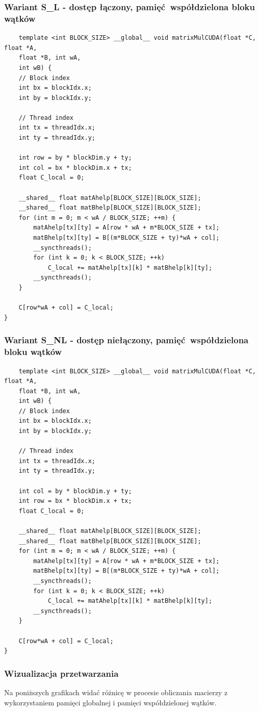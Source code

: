 \documentclass[10pt,a4paper]{article}
\begin{document}
\subsubsection*{Wariant S\_L - dostęp łączony, pamięć współdzielona bloku wątków}
\begin{lstlisting}
	template <int BLOCK_SIZE> __global__ void matrixMulCUDA(float *C, float *A,
	float *B, int wA,
	int wB) {
	// Block index
	int bx = blockIdx.x;
	int by = blockIdx.y;

	// Thread index
	int tx = threadIdx.x;
	int ty = threadIdx.y;

	int row = by * blockDim.y + ty;
	int col = bx * blockDim.x + tx;
	float C_local = 0;

	__shared__ float matAhelp[BLOCK_SIZE][BLOCK_SIZE];
	__shared__ float matBhelp[BLOCK_SIZE][BLOCK_SIZE];
	for (int m = 0; m < wA / BLOCK_SIZE; ++m) {
		matAhelp[tx][ty] = A[row * wA + m*BLOCK_SIZE + tx];
		matBhelp[tx][ty] = B[(m*BLOCK_SIZE + ty)*wA + col];
		__syncthreads();
		for (int k = 0; k < BLOCK_SIZE; ++k)
			C_local += matAhelp[tx][k] * matBhelp[k][ty];
		__syncthreads();
	}

	C[row*wA + col] = C_local;
}
\end{lstlisting}

\subsubsection*{Wariant S\_NL - dostęp niełączony, pamięć współdzielona bloku wątków}
\begin{lstlisting}
	template <int BLOCK_SIZE> __global__ void matrixMulCUDA(float *C, float *A,
	float *B, int wA,
	int wB) {
	// Block index
	int bx = blockIdx.x;
	int by = blockIdx.y;

	// Thread index
	int tx = threadIdx.x;
	int ty = threadIdx.y;

	int col = by * blockDim.y + ty;
	int row = bx * blockDim.x + tx;
	float C_local = 0;

	__shared__ float matAhelp[BLOCK_SIZE][BLOCK_SIZE];
	__shared__ float matBhelp[BLOCK_SIZE][BLOCK_SIZE];
	for (int m = 0; m < wA / BLOCK_SIZE; ++m) {
		matAhelp[tx][ty] = A[row * wA + m*BLOCK_SIZE + tx];
		matBhelp[tx][ty] = B[(m*BLOCK_SIZE + ty)*wA + col];
		__syncthreads();
		for (int k = 0; k < BLOCK_SIZE; ++k)
			C_local += matAhelp[tx][k] * matBhelp[k][ty];
		__syncthreads();
	}

	C[row*wA + col] = C_local;
}
\end{lstlisting}
\newpage
\subsubsection*{Wizualizacja przetwarzania}
Na poniższych grafikach widać różnicę w procesie obliczania macierzy z wykorzystaniem
pamięci globalnej i pamięci współdzielonej wątków.\\
\end{document}
